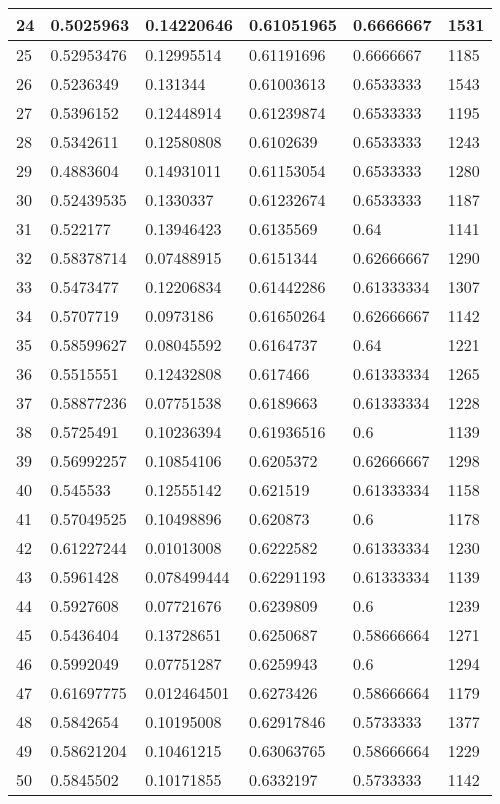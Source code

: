 \begin{longtable}{|l|l|l|l|l|l|}
24 & 0.5025963 & 0.14220646 & 0.61051965 & 0.6666667 & 1531 \\ \hline 
25 & 0.52953476 & 0.12995514 & 0.61191696 & 0.6666667 & 1185 \\ \hline 
26 & 0.5236349 & 0.131344 & 0.61003613 & 0.6533333 & 1543 \\ \hline 
27 & 0.5396152 & 0.12448914 & 0.61239874 & 0.6533333 & 1195 \\ \hline 
28 & 0.5342611 & 0.12580808 & 0.6102639 & 0.6533333 & 1243 \\ \hline 
29 & 0.4883604 & 0.14931011 & 0.61153054 & 0.6533333 & 1280 \\ \hline 
30 & 0.52439535 & 0.1330337 & 0.61232674 & 0.6533333 & 1187 \\ \hline 
31 & 0.522177 & 0.13946423 & 0.6135569 & 0.64 & 1141 \\ \hline 
32 & 0.58378714 & 0.07488915 & 0.6151344 & 0.62666667 & 1290 \\ \hline 
33 & 0.5473477 & 0.12206834 & 0.61442286 & 0.61333334 & 1307 \\ \hline 
34 & 0.5707719 & 0.0973186 & 0.61650264 & 0.62666667 & 1142 \\ \hline 
35 & 0.58599627 & 0.08045592 & 0.6164737 & 0.64 & 1221 \\ \hline 
36 & 0.5515551 & 0.12432808 & 0.617466 & 0.61333334 & 1265 \\ \hline 
37 & 0.58877236 & 0.07751538 & 0.6189663 & 0.61333334 & 1228 \\ \hline 
38 & 0.5725491 & 0.10236394 & 0.61936516 & 0.6 & 1139 \\ \hline 
39 & 0.56992257 & 0.10854106 & 0.6205372 & 0.62666667 & 1298 \\ \hline 
40 & 0.545533 & 0.12555142 & 0.621519 & 0.61333334 & 1158 \\ \hline 
41 & 0.57049525 & 0.10498896 & 0.620873 & 0.6 & 1178 \\ \hline 
42 & 0.61227244 & 0.01013008 & 0.6222582 & 0.61333334 & 1230 \\ \hline 
43 & 0.5961428 & 0.078499444 & 0.62291193 & 0.61333334 & 1139 \\ \hline 
44 & 0.5927608 & 0.07721676 & 0.6239809 & 0.6 & 1239 \\ \hline 
45 & 0.5436404 & 0.13728651 & 0.6250687 & 0.58666664 & 1271 \\ \hline 
46 & 0.5992049 & 0.07751287 & 0.6259943 & 0.6 & 1294 \\ \hline 
47 & 0.61697775 & 0.012464501 & 0.6273426 & 0.58666664 & 1179 \\ \hline 
48 & 0.5842654 & 0.10195008 & 0.62917846 & 0.5733333 & 1377 \\ \hline 
49 & 0.58621204 & 0.10461215 & 0.63063765 & 0.58666664 & 1229 \\ \hline 
50 & 0.5845502 & 0.10171855 & 0.6332197 & 0.5733333 & 1142 \\ \hline 
\end{longtable}